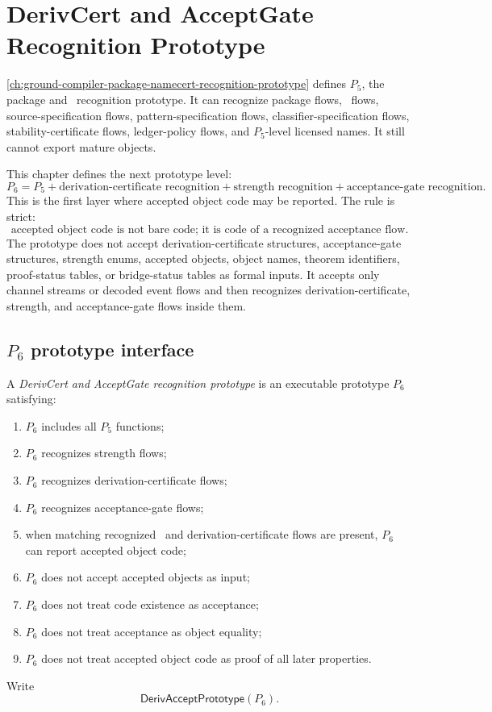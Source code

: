 \chapter{DerivCert and AcceptGate Recognition Prototype}
\label{ch:ground-compiler-derivcert-acceptgate-recognition-prototype}

\autoref{ch:ground-compiler-package-namecert-recognition-prototype} defines $P_5$, the package and \NameCert\ recognition prototype. It can recognize package flows, \NameCert\ flows, source-specification flows, pattern-specification flows, classifier-specification flows, stability-certificate flows, ledger-policy flows, and $P_5$-level licensed names. It still cannot export mature objects.

This chapter defines the next prototype level:
$$
  \boxed{P_6=P_5+\text{derivation-certificate recognition}+\text{strength recognition}+\text{acceptance-gate recognition}.}
$$
This is the first layer where accepted object code may be reported. The rule is strict:
$$
  \boxed{\text{accepted object code is not bare code; it is code of a recognized acceptance flow}.}
$$
The prototype does not accept derivation-certificate structures, acceptance-gate structures, strength enums, accepted objects, object names, theorem identifiers, proof-status tables, or bridge-status tables as formal inputs. It accepts only channel streams or decoded event flows and then recognizes derivation-certificate, strength, and acceptance-gate flows inside them.

\section{$P_6$ prototype interface}
\label{sec:deriv-accept-p6-interface}

\begin{definition}
\label{def:deriv-accept-p6-prototype}
A \emph{DerivCert and AcceptGate recognition prototype} is an executable prototype $P_6$ satisfying:
\begin{enumerate}
\item $P_6$ includes all $P_5$ functions;
\item $P_6$ recognizes strength flows;
\item $P_6$ recognizes derivation-certificate flows;
\item $P_6$ recognizes acceptance-gate flows;
\item when matching recognized \NameCert\ and derivation-certificate flows are present, $P_6$ can report accepted object code;
\item $P_6$ does not accept accepted objects as input;
\item $P_6$ does not treat code existence as acceptance;
\item $P_6$ does not treat acceptance as object equality;
\item $P_6$ does not treat accepted object code as proof of all later properties.
\end{enumerate}
Write
$$
  \mathsf{DerivAcceptPrototype}(P_6).
$$
\end{definition}

